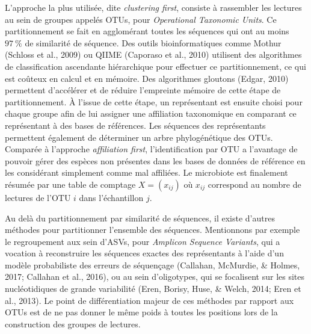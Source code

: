 \documentclass[12pt,a4paper]{reedthesis}
\theoremstyle{definition}
\theoremstyle{definition}
\theoremstyle{definition}
\theoremstyle{remark}
\begin{document}
L'approche la plus utilisée, dite \emph{clustering first}, consiste à rassembler les lectures au sein de groupes appelés OTUs, pour \emph{Operational Taxonomic Units}. Ce partitionnement se fait en agglomérant toutes les séquences qui ont au moins \(97~\%\) de similarité de séquence. Des outils bioinformatiques comme Mothur (Schloss et al., 2009) ou QIIME (Caporaso et al., 2010) utilisent des algorithmes de classification ascendante hiérarchique pour effectuer ce partitionnement, ce qui est coûteux en calcul et en mémoire. Des algorithmes gloutons (Edgar, 2010) permettent d'accélérer et de réduire l'empreinte mémoire de cette étape de partitionnement. À l'issue de cette étape, un représentant est ensuite choisi pour chaque groupe afin de lui assigner une affiliation taxonomique en comparant ce représentant à des bases de références. Les séquences des représentants permettent également de déterminer un arbre phylogénétique des OTUs. Comparée à l'approche \emph{affiliation first}, l'identification par OTU a l'avantage de pouvoir gérer des espèces non présentes dans les bases de données de référence en les considérant simplement comme mal affiliées. Le microbiote est finalement résumée par une table de comptage \(X = (x_{ij})\) où \(x_{ij}\) correspond au nombre de lectures de l'OTU \(i\) dans l'échantillon \(j\).

Au delà du partitionnement par similarité de séquences, il existe d'autres méthodes pour partitionner l'ensemble des séquences. Mentionnons par exemple le regroupement aux sein d'ASVs, pour \emph{Amplicon Sequence Variants}, qui a vocation à reconstruire les séquences exactes des représentants à l'aide d'un modèle probabiliste des erreurs de séquençage (Callahan, McMurdie, \& Holmes, 2017; Callahan et al., 2016), ou au sein d'oligotypes, qui se focalisent sur les sites nucléotidiques de grande variabilité (Eren, Borisy, Huse, \& Welch, 2014; Eren et al., 2013). Le point de différentiation majeur de ces méthodes par rapport aux OTUs est de ne pas donner le même poids à toutes les positions lors de la construction des groupes de lectures.
\end{document}

